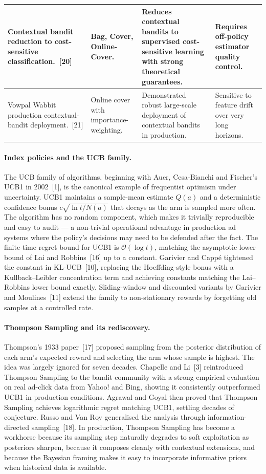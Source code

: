 {\begin{xltabular}{\linewidth}{|p{2.8cm}|p{3.0cm}|X|X|}
\hline
Contextual bandit reduction to cost-sensitive classification.~[20] & Bag, Cover, Online-Cover. & Reduces contextual bandits to supervised cost-sensitive learning with strong theoretical guarantees. & Requires off-policy estimator quality control.\\
\hline
Vowpal Wabbit production contextual-bandit deployment.~[21] & Online cover with importance-weighting. & Demonstrated robust large-scale deployment of contextual bandits in production. & Sensitive to feature drift over very long horizons.\\
\hline
\end{xltabular}}

\paragraph{Index policies and the UCB family.}
The UCB family of algorithms, beginning with Auer, Cesa-Bianchi and Fischer's UCB1 in 2002~[1], is the canonical example of frequentist optimism under uncertainty. UCB1 maintains a sample-mean estimate $Q(a)$ and a deterministic confidence bonus $c\sqrt{\ln t / N(a)}$ that decays as the arm is sampled more often. The algorithm has no random component, which makes it trivially reproducible and easy to audit --- a non-trivial operational advantage in production ad systems where the policy's decisions may need to be defended after the fact. The finite-time regret bound for UCB1 is $\mathcal{O}(\log t)$, matching the asymptotic lower bound of Lai and Robbins~[16] up to a constant. Garivier and Cappé tightened the constant in KL-UCB~[10], replacing the Hoeffding-style bonus with a Kullback--Leibler concentration term and achieving constants matching the Lai--Robbins lower bound exactly. Sliding-window and discounted variants by Garivier and Moulines~[11] extend the family to non-stationary rewards by forgetting old samples at a controlled rate.

\paragraph{Thompson Sampling and its rediscovery.}
Thompson's 1933 paper~[17] proposed sampling from the posterior distribution of each arm's expected reward and selecting the arm whose sample is highest. The idea was largely ignored for seven decades. Chapelle and Li~[3] reintroduced Thompson Sampling to the bandit community with a strong empirical evaluation on real ad-click data from Yahoo! and Bing, showing it consistently outperformed UCB1 in production conditions. Agrawal and Goyal then proved that Thompson Sampling achieves logarithmic regret matching UCB1, settling decades of conjecture. Russo and Van Roy generalised the analysis through information-directed sampling~[18]. In production, Thompson Sampling has become a workhorse because its sampling step naturally degrades to soft exploitation as posteriors sharpen, because it composes cleanly with contextual extensions, and because the Bayesian framing makes it easy to incorporate informative priors when historical data is available.


